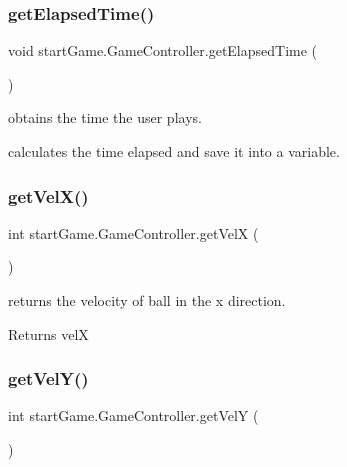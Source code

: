 \subsubsection{\texorpdfstring{get\+Elapsed\+Time()}{getElapsedTime()}}
{\footnotesize\ttfamily void start\+Game.\+Game\+Controller.\+get\+Elapsed\+Time (\begin{DoxyParamCaption}{ }\end{DoxyParamCaption})\hspace{0.3cm}{\ttfamily [private]}}



obtains the time the user plays. 

calculates the time elapsed and save it into a variable. \hypertarget{classstart_game_1_1_game_controller_a2170345005b5f2f453951dd7b4691e0f}{}\label{classstart_game_1_1_game_controller_a2170345005b5f2f453951dd7b4691e0f} 
\subsubsection{\texorpdfstring{get\+Vel\+X()}{getVelX()}}
{\footnotesize\ttfamily int start\+Game.\+Game\+Controller.\+get\+VelX (\begin{DoxyParamCaption}{ }\end{DoxyParamCaption})}



returns the velocity of ball in the x direction. 

\begin{DoxyReturn}{Returns}
velX 
\end{DoxyReturn}
\hypertarget{classstart_game_1_1_game_controller_a03bc4dfd9bc501924f18e7f9f49361db}{}\label{classstart_game_1_1_game_controller_a03bc4dfd9bc501924f18e7f9f49361db} 
\subsubsection{\texorpdfstring{get\+Vel\+Y()}{getVelY()}}
{\footnotesize\ttfamily int start\+Game.\+Game\+Controller.\+get\+VelY (\begin{DoxyParamCaption}{ }\end{DoxyParamCaption})}



